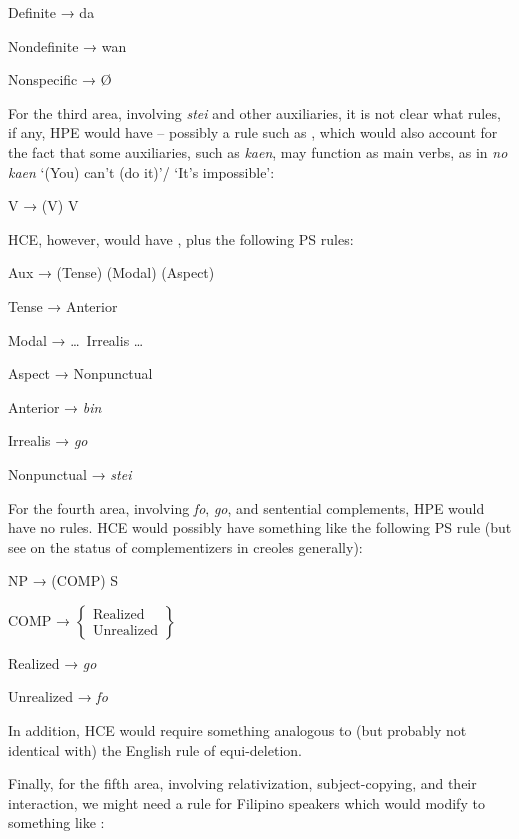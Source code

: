 \ea\label{ex:94}
{\rm Definite}  → da
\z

\ea\label{ex:95}
{\rm Nondefinite} → wan
\z

\ea\label{ex:96}
{\rm Nonspecific} → \O
\z

For the third area, involving \textit{stei} and other auxiliaries, it is not clear what rules, if any, HPE would have -- possibly a rule such as , which would also account for the fact that some auxiliaries, such as \textit{kaen}, may function as main verbs, as in \textit{no kaen} `(You) can't (do it)'/ `It's impossible':

\ea\label{ex:97}
V → (V) V
\z

\noindent HCE, however, would have , plus the following PS rules:

\ea\label{ex:98}
 Aux → (Tense) (Modal) (Aspect)
\z

\ea\label{ex:99}
 Tense → Anterior
\z
{}

\ea\label{ex:100}
 Modal → \ldots~Irrealis \ldots
\z

\ea\label{ex:101}
 Aspect → Nonpunctual
\z

\ea\label{ex:102}
 {\rm Anterior} → \textit{bin}
\z

\ea\label{ex:103}
 {\rm Irrealis} → \textit{go}
\z

\ea\label{ex:104}
 {\rm Nonpunctual} → \textit{stei}
\z


For the fourth area, involving \textit{fo}, \textit{go}, and sentential comple\-ments, HPE would have no rules. HCE would possibly have something like the following PS rule (but see  on the status of complementizers in creoles generally):

\ea\label{ex:105}
NP → (COMP) S 
\z

\ea\label{ex:106}
 COMP → $\left\{\begin{array}{l}\text{Realized}\\\text{Unrealized}\end{array}\right\}$
\z

\ea\label{ex:107}
 {\rm Realized} → \textit{go}
\z

\ea\label{ex:108}
{\rm Unrealized} → \textit{fo}
\z

\noindent In addition, HCE would require something analogous to (but probably not identical with) the English rule of equi-deletion.

Finally, for the fifth area, involving relativization, subject-copying, and their interaction, we might need a rule for Filipino speakers which would modify  to something like :

